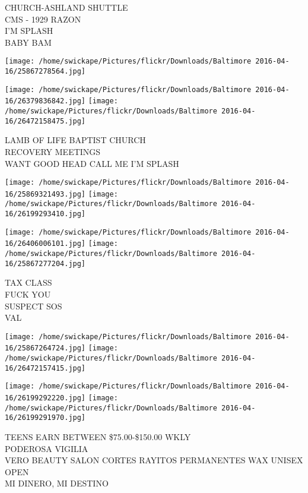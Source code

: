 \documentclass[10pt,letterpaper]{article}
\begin{document}
CHURCH{-}ASHLAND SHUTTLE\\
CMS {-} 1929 RAZON\\
I'M SPLASH\\
BABY BAM\\
\pagebreak

\texttt{[image: /home/swickape/Pictures/flickr/Downloads/Baltimore 2016-04-16/25867278564.jpg]}

\vspace{0.25in}
\texttt{[image: /home/swickape/Pictures/flickr/Downloads/Baltimore 2016-04-16/26379836842.jpg]}
\texttt{[image: /home/swickape/Pictures/flickr/Downloads/Baltimore 2016-04-16/26472158475.jpg]}

LAMB OF LIFE BAPTIST CHURCH\\
RECOVERY MEETINGS\\
WANT GOOD HEAD CALL ME I'M SPLASH\\
\pagebreak

\texttt{[image: /home/swickape/Pictures/flickr/Downloads/Baltimore 2016-04-16/25869321493.jpg]}
\texttt{[image: /home/swickape/Pictures/flickr/Downloads/Baltimore 2016-04-16/26199293410.jpg]}

\texttt{[image: /home/swickape/Pictures/flickr/Downloads/Baltimore 2016-04-16/26406006101.jpg]}
\texttt{[image: /home/swickape/Pictures/flickr/Downloads/Baltimore 2016-04-16/25867277204.jpg]}

TAX CLASS\\
FUCK YOU\\
SUSPECT SOS\\
VAL\\
\pagebreak

\texttt{[image: /home/swickape/Pictures/flickr/Downloads/Baltimore 2016-04-16/25867264724.jpg]}
\texttt{[image: /home/swickape/Pictures/flickr/Downloads/Baltimore 2016-04-16/26472157415.jpg]}

\texttt{[image: /home/swickape/Pictures/flickr/Downloads/Baltimore 2016-04-16/26199292220.jpg]}
\texttt{[image: /home/swickape/Pictures/flickr/Downloads/Baltimore 2016-04-16/26199291970.jpg]}

TEENS EARN BETWEEN \$75.00{-}\$150.00 WKLY\\
PODEROSA VIGILIA\\
VERO BEAUTY SALON CORTES RAYITOS PERMANENTES WAX UNISEX OPEN\\
MI DINERO, MI DESTINO\\
\pagebreak
\end{document}
